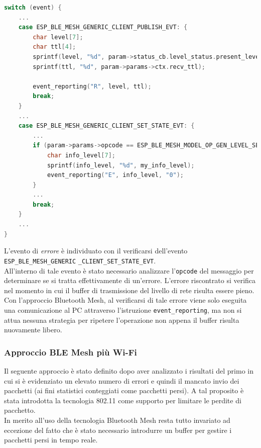 \begin{lstlisting}[language=C, caption= evento di ricezione e errore in fase d'invio]
switch (event) {
    ...
    case ESP_BLE_MESH_GENERIC_CLIENT_PUBLISH_EVT: {
        char level[7];
        char ttl[4];
        sprintf(level, "%d", param->status_cb.level_status.present_level);
        sprintf(ttl, "%d", param->params->ctx.recv_ttl);
        
        event_reporting("R", level, ttl);
        break;
    }
    ...
    case ESP_BLE_MESH_GENERIC_CLIENT_SET_STATE_EVT: {
        ...
        if (param->params->opcode == ESP_BLE_MESH_MODEL_OP_GEN_LEVEL_SET_UNACK) {
            char info_level[7];
            sprintf(info_level, "%d", my_info_level);
            event_reporting("E", info_level, "0");
        }
        ...
        break;
    }
    ...
}
\end{lstlisting}

\noindent L'evento di \textit{errore} è individuato con il verificarsi dell'evento \texttt{ESP\_BLE\_MESH\_GENERIC} \texttt{\_CLIENT\_SET\_STATE\_EVT}.\\ All'interno di tale evento è stato necessario analizzare l'\texttt{opcode} del messaggio per determinare se si tratta effettivamente di un'errore. L'errore riscontrato si verifica nel momento in cui il buffer di trasmissione del livello di rete risulta essere pieno.\\
Con l'approccio Bluetooth Mesh, al verificarsi di tale errore viene solo eseguita una comunicazione al PC attraverso l'istruzione \texttt{event\_reporting}, ma non si attua nessuna strategia per ripetere l'operazione non appena il buffer risulta nuovamente libero.

\subsubsection{Approccio BLE Mesh più Wi-Fi}
\label{subsub:BLE_WiFi}
Il seguente approccio è stato definito dopo aver analizzato i risultati del primo in cui si è evidenziato un elevato numero di errori e quindi il mancato invio dei pacchetti (ai fini statistici conteggiati come pacchetti persi). A tal proposito è stata introdotta la tecnologia 802.11 come supporto per limitare le perdite di pacchetto.\\
In merito all'uso della tecnologia Bluetooth Mesh resta tutto invariato ad eccezione del fatto che è stato necessario introdurre un buffer per gestire i pacchetti persi in tempo reale.\\

